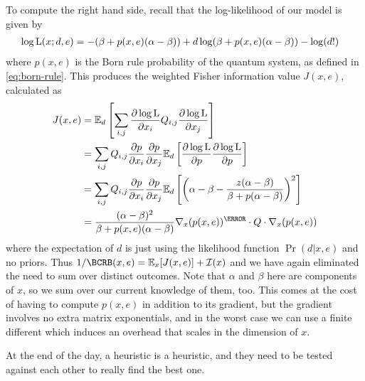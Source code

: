 \documentclass[aps,nofootinbib,twocolumn,superscriptaddress]{revtex4}
\newcommand{\mps}{x}
\newcommand{\eps}{e}
\newcommand{\data}{d}
\begin{document}
To compute the right hand side, recall that the log-likelihood of
our model is given by
\begin{align}
    \log\Lhood(\mps;\data,\eps)
        &= -(\beta+p(\mps,\eps)(\alpha-\beta))
            + \data\log(\beta+p(\mps,\eps)(\alpha-\beta))
            - \log(\data!)
\end{align}
where $p(\mps,\eps)$ is the Born rule probability of the quantum
system, as defined in \autoref{eq:born-rule}.
This produces the weighted Fisher information value $J(\mps,\eps)$,
calculated as
\begin{align}
    J(\mps,\eps) &= \expect_\data \left[
            \sum_{i,j}
            \frac{\partial\log\Lhood}{\partial\mps_i}Q_{i,j}
            \frac{\partial\log\Lhood}{\partial\mps_j}
        \right] \nonumber \\
        &= \sum_{i,j} Q_{i,j}
        \frac{\partial p}{\partial\mps_i}
        \frac{\partial p}{\partial\mps_j}
        \expect_\data \left[
            \frac{\partial\log\Lhood}{\partial p}
            \frac{\partial\log\Lhood}{\partial p}
        \right] \nonumber \\
        &= \sum_{i,j} Q_{i,j}
        \frac{\partial p}{\partial\mps_i}
        \frac{\partial p}{\partial\mps_j}
        \expect_\data \left[
            \left(
                \alpha-\beta-\frac{z(\alpha-\beta)}{\beta+p(\alpha-\beta)}
            \right)^2
        \right] \nonumber \\
        &= \frac{(\alpha-\beta)^2}{\beta+p(\mps,\eps)(\alpha-\beta)}
            \nabla_\mps(p(\mps,\eps))^\T\cdot Q\cdot \nabla_\mps(p(\mps,\eps))
\end{align}
where the expectation of $\data$ is just using the likelihood function
$\Pr(\data|\mps,\eps)$ and no priors.
Thus $1/\BCRB(\mps,\eps)=\expect_\mps [J(\mps,\eps)]+\mathcal{I}(\mps)$
and we have again eliminated the need to sum over distinct outcomes.
Note that $\alpha$ and $\beta$ here are components of $\mps$, so we
sum over our current knowledge of them, too.
This comes at the cost of having to compute $p(\mps,\eps)$ in addition
to its gradient, but the gradient involves no extra matrix exponentials,
and in the worst case we can use a finite different which induces
an overhead that scales in the dimension of $\mps$.

At the end of the day, a heuristic is a heuristic, and they need to
be tested against each other to really find the best one.
\end{document}
